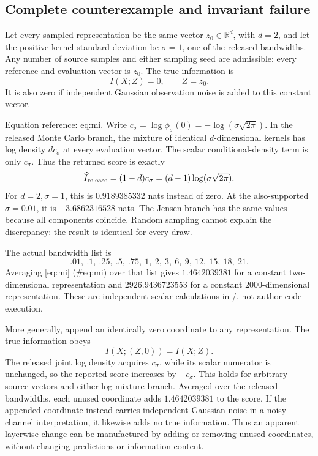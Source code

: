\documentclass[10pt]{article}
\begin{document}
\subsection*{Complete counterexample and invariant failure}
Let every sampled representation be the same vector \(z_0\in\mathbb R^d\), with \(d=2\), and let the positive kernel standard deviation be \(\sigma=1\), one of the released bandwidths. Any number of source samples and either sampling seed are admissible: every reference and evaluation vector is \(z_0\). The true information is \[I(X;Z)=0,\qquad Z=z_0.\] It is also zero if independent Gaussian observation noise is added to this constant vector.\par
Equation reference: eq:mi. Write \(c_\sigma=\log\phi_\sigma(0)=-\log(\sigma\sqrt{2\pi})\). In the released Monte Carlo branch, the mixture of identical \(d\)-dimensional kernels has log density \(dc_\sigma\) at every evaluation vector. The scalar conditional-density term is only \(c_\sigma\). Thus the returned score is exactly \[
\widehat I_{\rm release}=(1-d)c_\sigma
=(d-1)\log(\sigma\sqrt{2\pi}).\] For \(d=2,\sigma=1\), this is \(0.9189385332\) nats instead of zero. At the also-supported \(\sigma=0.01\), it is \(-3.6862316528\) nats. The Jensen branch has the same values because all components coincide. Random sampling cannot explain the discrepancy: the result is identical for every draw.\par
The actual bandwidth list is \[.01,\ .1,\ .25,\ .5,\ .75,\ 1,\ 2,\ 3,\ 6,\ 9,\ 12,\ 15,\ 18,\ 21.\] Averaging [eq:mi] (\#eq:mi) over that list gives \(1.4642039381\) for a constant two-dimensional representation and \(2926.9436723553\) for a constant 2000-dimensional representation. These are independent scalar calculations in /, not author-code execution.\par
More generally, append an identically zero coordinate to any representation. The true information obeys \[I(X;(Z,0))=I(X;Z).\] The released joint log density acquires \(c_\sigma\), while its scalar numerator is unchanged, so the reported score increases by \(-c_\sigma\). This holds for arbitrary source vectors and either log-mixture branch. Averaged over the released bandwidths, each unused coordinate adds \(1.4642039381\) to the score. If the appended coordinate instead carries independent Gaussian noise in a noisy-channel interpretation, it likewise adds no true information. Thus an apparent layerwise change can be manufactured by adding or removing unused coordinates, without changing predictions or information content.\par
\end{document}

